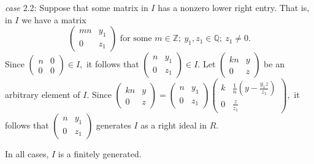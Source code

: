 \documentclass[12pt]{article}
\begin{document}
\emph{case} 2.2: Suppose that some matrix in $I$ has a nonzero lower right entry. That is, in $I$ 
we have a matrix
\[
\begin{pmatrix}
mn & y_1\\
0 & z_1
\end{pmatrix}
\text{ for some }m\in\mathbb{Z};\ y_1, z_1\in \mathbb{Q};\ z_1\neq 0.
\]
Since
\(
\begin{pmatrix}
n & 0\\
0 & 0
\end{pmatrix}
\in I,
\) it follows that
\(
\begin{pmatrix}
n & y_1\\
0 & z_1
\end{pmatrix}
\in I.
\)
Let 
\(
\begin{pmatrix}
kn & y\\
0 & z
\end{pmatrix}
\) 
be an arbitrary element of $I$. Since
\(
\begin{pmatrix}
kn & y\\
0 & z
\end{pmatrix}
=
\begin{pmatrix}
n & y_1\\
0 & z_1
\end{pmatrix}
\begin{pmatrix}
k & \frac{1}{n}(y-\frac{y_1z}{z_1})\\
0 & \frac{z}{z_1}
\end{pmatrix},
\) it follows that
\(
\begin{pmatrix}
n & y_1\\
0 & z_1
\end{pmatrix}
\)
generates $I$ as a right ideal in $R$.

In all cases, $I$ is a finitely generated.
\end{document}
